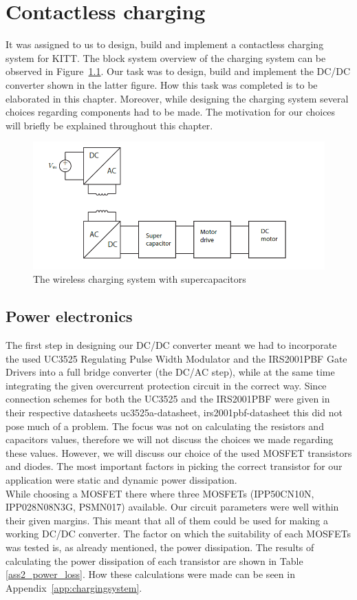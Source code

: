 \documentclass[11pt,titlepage]{report}
\begin{document}
\chapter{Contactless charging}
\label{Contactless charging}
It was assigned to us to design, build and implement a contactless charging system for KITT. The block system overview of the charging system can be observed in Figure~\ref{fig:contactless_charging}. Our task was to design, build and implement the DC/DC converter shown in the latter figure. How this task was completed is to be elaborated in this chapter. Moreover, while designing the charging system several choices regarding components had to be made. The motivation for our choices will briefly be explained throughout this chapter. \\	

\begin{figure}[H]
	\begin{center}
		\includegraphics[width=0.8\linewidth]{resource/contactless_charging.png}
	\end{center}
	\caption{The wireless charging system with supercapacitors}
	\label{fig:contactless_charging}
\end{figure}


\section{Power electronics}
The first step in designing our DC/DC converter meant we had to incorporate the used UC3525 Regulating
Pulse Width Modulator and the IRS2001PBF Gate Drivers into a full bridge converter (the
DC/AC step), while at the same time integrating the given overcurrent protection circuit in the correct
way. Since connection schemes for both the UC3525 and the IRS2001PBF were given in their respective
datasheets uc3525a-datasheet, irs2001pbf-datasheet this did not pose much of a problem. The focus
was not on calculating the resistors and capacitors values, therefore we will not discuss the choices we
made regarding these values. However, we will discuss our choice of the used MOSFET transistors and
diodes. The most important factors in picking the correct transistor for our application were static and
dynamic power dissipation. \\
While choosing a MOSFET	there where three MOSFETs (IPP50CN10N, IPP028N08N3G, PSMN017) available. Our circuit parameters were well within their given margins. This meant that all of them could be used for making a working DC/DC converter. The factor on which the suitability of each MOSFETs was tested is, as already mentioned, the power dissipation. The results of calculating the power dissipation of each transistor are shown in Table \ref{ass2_power_loss}. How these calculations were made can be seen in Appendix~\ref{app:chargingsystem}. 
\end{document}
